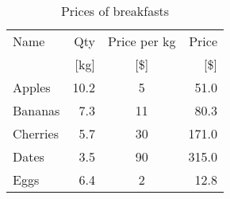\documentclass[11pt, a4paper]{article}
\begin{document}
\begin{table}[htb]
    \centering
    \label{tab:ex1}
    \caption{Prices of breakfasts}
    \begin{tabular}{@{}lrcr@{}}
        \toprule
        Name & Qty & Price per kg & Price \\\relax
         & [kg] & [\$] & [\$] \\
        \midrule
        Apples & 10.2 & 5 & 51.0 \\
        Bananas & 7.3 & 11 & 80.3 \\
        Cherries & 5.7 & 30 & 171.0 \\
        Dates & 3.5 & 90 & 315.0 \\
        Eggs & 6.4 & 2 & 12.8 \\
        \bottomrule
    \end{tabular}
\end{table}
\end{document}

